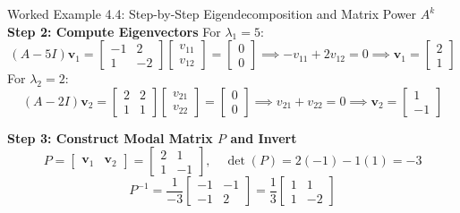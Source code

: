\begin{examplebox}{Worked Example 4.4: Step-by-Step Eigendecomposition and Matrix Power $A^k$}
\textbf{Step 2: Compute Eigenvectors}
For $\lambda_1 = 5$:
\begin{equation*}
(A - 5I)\mathbf{v}_1 = \begin{bmatrix} -1 & 2 \\ 1 & -2 \end{bmatrix} \begin{bmatrix} v_{11} \\ v_{12} \end{bmatrix} = \begin{bmatrix} 0 \\ 0 \end{bmatrix} \implies -v_{11} + 2v_{12} = 0 \implies \mathbf{v}_1 = \begin{bmatrix} 2 \\ 1 \end{bmatrix}
\end{equation*}
For $\lambda_2 = 2$:
\begin{equation*}
(A - 2I)\mathbf{v}_2 = \begin{bmatrix} 2 & 2 \\ 1 & 1 \end{bmatrix} \begin{bmatrix} v_{21} \\ v_{22} \end{bmatrix} = \begin{bmatrix} 0 \\ 0 \end{bmatrix} \implies v_{21} + v_{22} = 0 \implies \mathbf{v}_2 = \begin{bmatrix} 1 \\ -1 \end{bmatrix}
\end{equation*}

\textbf{Step 3: Construct Modal Matrix $P$ and Invert}
\begin{equation*}
P = \begin{bmatrix} \mathbf{v}_1 & \mathbf{v}_2 \end{bmatrix} = \begin{bmatrix} 2 & 1 \\ 1 & -1 \end{bmatrix}, \quad \det(P) = 2(-1) - 1(1) = -3
\end{equation*}
\begin{equation*}
P^{-1} = \frac{1}{-3} \begin{bmatrix} -1 & -1 \\ -1 & 2 \end{bmatrix} = \frac{1}{3} \begin{bmatrix} 1 & 1 \\ 1 & -2 \end{bmatrix}
\end{equation*}


\end{examplebox}
